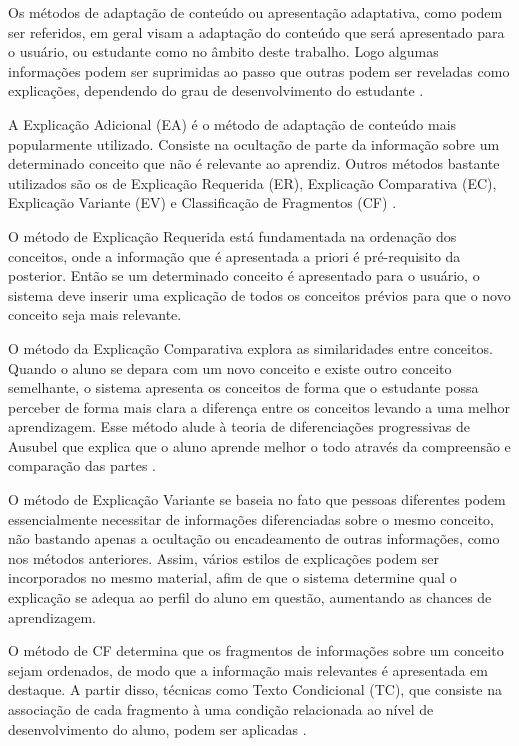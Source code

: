 Os métodos de adaptação de conteúdo ou apresentação adaptativa, como podem ser referidos, em geral visam a adaptação do conteúdo que será apresentado para o usuário, ou estudante como no âmbito deste trabalho. Logo algumas informações podem ser suprimidas ao passo que outras podem ser reveladas como explicações, dependendo do grau de desenvolvimento do estudante \cite{brusilovsky1996, fragelli2010, diniz2012}.

A Explicação Adicional (EA) é o método de adaptação de conteúdo mais popularmente utilizado. Consiste na ocultação de parte da informação sobre um determinado conceito que não é relevante ao aprendiz. Outros métodos bastante utilizados são os de Explicação Requerida (ER), Explicação Comparativa (EC), Explicação Variante (EV) e Classificação de Fragmentos (CF) \cite{brusilovsky1996, fragelli2010}. 

O método de Explicação Requerida está fundamentada na ordenação dos conceitos, onde a informação que é apresentada a priori é pré-requisito da posterior. Então se um determinado conceito é apresentado para o usuário, o sistema deve inserir uma explicação de todos os conceitos prévios para que o novo conceito seja mais relevante.

O método da Explicação Comparativa explora as similaridades entre conceitos. Quando o aluno se depara com um novo conceito e existe outro conceito semelhante, o sistema apresenta os conceitos de forma que o estudante possa perceber de forma mais clara a diferença entre os conceitos levando a uma melhor aprendizagem. Esse método alude à teoria de diferenciações progressivas de Ausubel que explica que o aluno aprende melhor o todo através da compreensão e comparação das partes \cite{brusilovsky1998, ausubel2000}.

O método de Explicação Variante se baseia no fato que pessoas diferentes podem essencialmente necessitar de informações diferenciadas sobre o mesmo conceito, não bastando apenas a ocultação ou encadeamento de outras informações, como nos métodos anteriores. Assim, vários estilos de explicações podem ser incorporados no mesmo material, afim de que o sistema determine qual o explicação se adequa ao perfil do aluno em questão, aumentando as chances de aprendizagem.

O método de CF determina que os fragmentos de informações sobre um conceito sejam ordenados, de modo que a informação mais relevantes é apresentada em destaque. A partir disso, técnicas como Texto Condicional (TC), que consiste na associação de cada fragmento à uma condição relacionada ao nível de desenvolvimento do aluno, podem ser aplicadas \cite{brusilovsky1996}.

